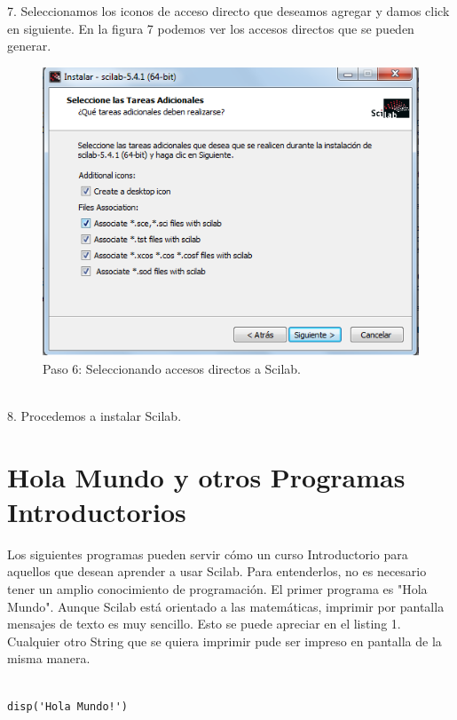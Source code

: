 \documentclass[11pt]{article} %
\begin{document}
7.	Seleccionamos los iconos de acceso directo que deseamos agregar y damos click en siguiente. 
	En la figura 7 podemos ver los accesos directos que se pueden generar.
\\%
\begin{figure}[!h]
  \centering
    \includegraphics[scale=0.5]{Captura6}
  \caption{Paso 6: Seleccionando accesos directos a Scilab.}
  \label{fig:paso6}
\end{figure}
\\%

8.	Procedemos a instalar Scilab.
\\%

\section{Hola Mundo y otros Programas Introductorios}

Los siguientes programas pueden servir cómo un curso Introductorio para aquellos que desean aprender a usar Scilab. Para entenderlos, no es necesario tener un amplio conocimiento de programación. El primer programa es "Hola Mundo". Aunque Scilab está orientado a las matemáticas, imprimir por pantalla mensajes de texto es muy sencillo. Esto se puede apreciar en el listing 1. Cualquier otro String que se quiera imprimir pude ser impreso en pantalla de la misma manera.
\lstset{language=Scilab}          %
\begin{lstlisting}[caption= Código escrito en Scilab para imprimir por pantalla "Hola Mundo!", label=amb, frame=single]  % Start your code-block

disp('Hola Mundo!')
\end{lstlisting}
\end{document}
